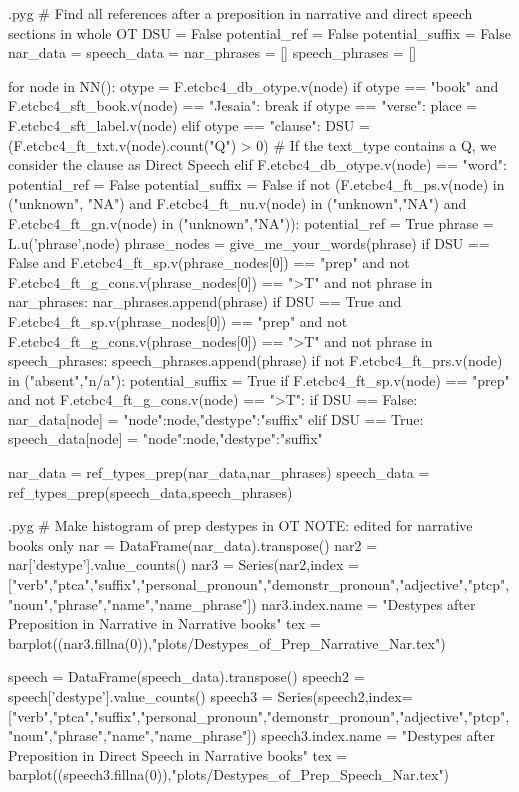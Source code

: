 \documentclass{report}
\makeatletter
\newenvironment{python}{%
  \VerbatimEnvironment
  \minted@resetoptions
  \setkeys{minted@opt}{}
      \begin{VerbatimOut}{\jobname.pyg}}
{%
      \end{VerbatimOut}
      \minted@pygmentize{python}
      \DeleteFile{\jobname.pyg}}
\makeatother
\begin{document}
\begin{python}
# Find all references after a preposition in narrative and direct speech sections in whole OT 
DSU = False
potential_ref = False
potential_suffix = False
nar_data = {}
speech_data = {}
nar_phrases = []
speech_phrases = []

for node in NN():
    otype = F.etcbc4_db_otype.v(node)
    if otype == "book" and F.etcbc4_sft_book.v(node) == "Jesaia":
        break
    if otype == "verse":
        place = F.etcbc4_sft_label.v(node)
    elif otype == "clause":
        DSU = (F.etcbc4_ft_txt.v(node).count("Q") > 0)    # If the text_type contains a Q, we consider the clause as Direct Speech
    elif F.etcbc4_db_otype.v(node) == "word":
        potential_ref = False
        potential_suffix = False
        if not (F.etcbc4_ft_ps.v(node) in ("unknown", "NA") and F.etcbc4_ft_nu.v(node) in ("unknown","NA") and F.etcbc4_ft_gn.v(node) in ("unknown","NA")):
            potential_ref = True
            phrase = L.u('phrase',node)
            phrase_nodes = give_me_your_words(phrase)
            if DSU == False and F.etcbc4_ft_sp.v(phrase_nodes[0]) == "prep" and not F.etcbc4_ft_g_cons.v(phrase_nodes[0]) == ">T" and not phrase in nar_phrases:
                nar_phrases.append(phrase)
            if DSU == True and F.etcbc4_ft_sp.v(phrase_nodes[0]) == "prep" and not F.etcbc4_ft_g_cons.v(phrase_nodes[0]) == ">T" and not phrase in speech_phrases:
                speech_phrases.append(phrase) 
        if not F.etcbc4_ft_prs.v(node) in ("absent","n/a"):
            potential_suffix = True
            if F.etcbc4_ft_sp.v(node) == "prep" and not F.etcbc4_ft_g_cons.v(node) == ">T":
                if DSU == False:
                    nar_data[node] = {"node":node,"destype":"suffix"}
                elif DSU == True:
                    speech_data[node] = {"node":node,"destype":"suffix"}

nar_data = ref_types_prep(nar_data,nar_phrases)
speech_data = ref_types_prep(speech_data,speech_phrases)

\end{python}

\begin{python}
# Make histogram of prep destypes in OT NOTE: edited for narrative books only
nar = DataFrame(nar_data).transpose()
nar2 = nar['destype'].value_counts()
nar3 = Series(nar2,index = ["verb","ptca","suffix","personal_pronoun","demonstr_pronoun","adjective","ptcp","noun","phrase","name","name_phrase"])
nar3.index.name = "Destypes after Preposition in Narrative in Narrative books"
tex = barplot((nar3.fillna(0)),"plots/Destypes_of_Prep_Narrative_Nar.tex")

speech = DataFrame(speech_data).transpose()
speech2 = speech['destype'].value_counts()
speech3 = Series(speech2,index=["verb","ptca","suffix","personal_pronoun","demonstr_pronoun","adjective","ptcp","noun","phrase","name","name_phrase"])
speech3.index.name = "Destypes after Preposition in Direct Speech in Narrative books"
tex = barplot((speech3.fillna(0)),"plots/Destypes_of_Prep_Speech_Nar.tex")

\end{python}
\end{document}
